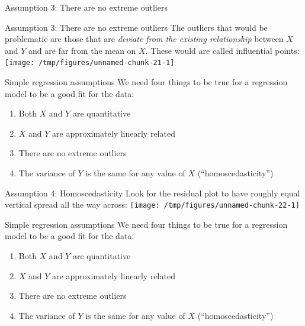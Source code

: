 \documentclass{beamer}\usepackage[]{graphicx}\usepackage[]{color}
\newenvironment{knitrout}{}{} %
\begin{document}
\begin{darkframes}
\begin{frame}[fragile]{Assumption 3: There are no extreme outliers}
\begin{knitrout}
\end{knitrout}
    \end{frame}

    \begin{frame}[fragile]{Assumption 3: There are no extreme outliers}
      The outliers that would be problematic are those that are \emph{deviate from the existing relationship} between $X$ and $Y$ and are far from the mean on $X$. These would are called \alert{influential points}:
\begin{knitrout}
\color{fgcolor}
\texttt{[image: /tmp/figures/unnamed-chunk-21-1]} 

\end{knitrout}
    \end{frame}

    \begin{frame}{Simple regression assumptions}
      We need four things to be true for a regression model to be a good fit for the data:
      \begin{enumerate}
        \item Both $X$ and $Y$ are quantitative \greencheckmark
        \item $X$ and $Y$ are approximately linearly related \greencheckmark
        \item There are no extreme outliers \greencheckmark
        \item The variance of $Y$ is the same for any value of $X$ (``homoscedasticity'')
      \end{enumerate}
    \end{frame}

    \begin{frame}[fragile]{Assumption 4: Homoscedasticity}
      Look for the residual plot to have roughly equal vertical spread all the way across:
\begin{knitrout}
\color{fgcolor}
\texttt{[image: /tmp/figures/unnamed-chunk-22-1]} 

\end{knitrout}
    \end{frame}

    \begin{frame}{Simple regression assumptions}
      We need four things to be true for a regression model to be a good fit for the data:
      \begin{enumerate}
        \item Both $X$ and $Y$ are quantitative \greencheckmark
        \item $X$ and $Y$ are approximately linearly related \greencheckmark
        \item There are no extreme outliers \greencheckmark
        \item The variance of $Y$ is the same for any value of $X$ (``homoscedasticity'') \greencheckmark
      \end{enumerate}
    \end{frame}


\end{darkframes}
\end{document}
